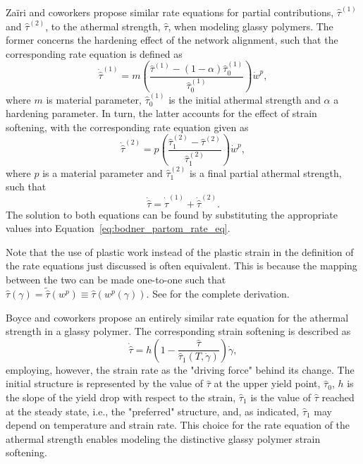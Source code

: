 Zaïri and coworkers \citep{zairiElastoviscoplasticConstitutiveEquations2007} propose similar rate equations for partial contributions, $\hat \tau^{(1)}$ and $\hat \tau^{(2)}$, to the athermal strength, $\hat \tau$, when modeling glassy polymers.
The former concerns the hardening effect of the network alignment, such that the corresponding rate equation is defined as
\begin{equation}
  \dot{\hat\tau}^{(1)} = m\left(\frac{\hat\tau^{(1)} - (1 - \alpha)\hat\tau^{(1)}_0}{\hat\tau^{(1)}_0}\right)\dot w^p,
\end{equation}
where $m$ is material parameter, $\hat\tau^{(1)}_0$ is the initial athermal strength and $\alpha$ a hardening parameter.
In turn, the latter accounts for the effect of strain softening, with the corresponding rate equation given as
\begin{equation}
  \dot{\hat\tau}^{(2)} = p\left(\frac{\hat\tau^{(2)}_1 - \hat\tau^{(2)}}{\hat\tau^{(2)}_1}\right)\dot w^p,
\end{equation}
where $p$ is a material parameter and $\hat\tau^{(2)}_1$ is a final partial athermal strength, such that
\begin{equation}
  \label{eq:rate_eq_zairi}
  \dot{\hat \tau} = \dot{\hat\tau}^{(1)} + \dot{\hat\tau}^{(2)}.
\end{equation}
The solution to both equations can be found by substituting the appropriate values into Equation~\eqref{eq:bodner_partom_rate_eq}.

Note that the use of plastic work instead of the plastic strain in the definition of the rate equations just discussed is often equivalent.
This is because the mapping between the two can be made one-to-one such that $\hat \tau(\gamma)=\tilde{\hat \tau}(w^p)\equiv \hat\tau(w^p(\gamma))$.
See \cite{desouzanetoComputationalMethodsPlasticity2008} for the complete derivation.

Boyce and coworkers \citep{boyceLargeInelasticDeformation1988} propose an entirely similar rate equation for the athermal strength in a glassy polymer.
The corresponding strain softening is described as
\begin{equation}
  \label{eq:rate_equation_bpa}
	\dot{\hat \tau}=h \left(1-\frac{\hat \tau}{\hat \tau_{1} \left(T, \dot{\gamma}\right)}\right)\dot{\gamma},
\end{equation}
employing, however, the strain rate as the "driving force" behind its change.
The initial structure is represented by the value of $\hat \tau$ at the upper yield point, $\hat \tau_0$, $h$ is the slope of the yield drop with respect to the strain, $\hat \tau_1$ is the value of $\hat \tau$ reached at the steady state, i.e., the "preferred" structure, and, as indicated, $\hat \tau_1$ may depend on temperature and strain rate.
This choice for the rate equation of the athermal strength enables modeling the distinctive glassy polymer strain softening.

